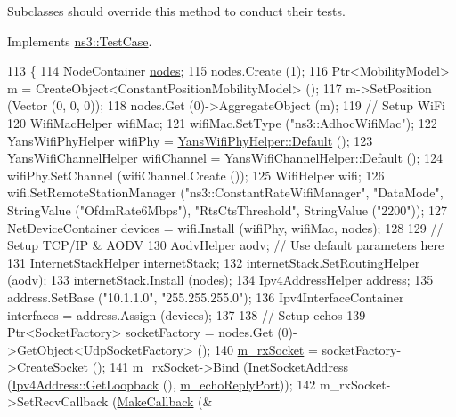 Subclasses should override this method to conduct their tests. 

Implements \hyperlink{classns3_1_1TestCase_a8ff74680cf017ed42011e4be51917a24}{ns3\+::\+Test\+Case}.


\begin{DoxyCode}
113 \{
114   NodeContainer \hyperlink{visualizer-ideas_8txt_a3e1b3808014a2c68ab0cd0182e041be2}{nodes};
115   nodes.Create (1);
116   Ptr<MobilityModel> m = CreateObject<ConstantPositionMobilityModel> ();
117   m->SetPosition (Vector (0, 0, 0));
118   nodes.Get (0)->AggregateObject (m);
119   \textcolor{comment}{// Setup WiFi}
120   WifiMacHelper wifiMac;
121   wifiMac.SetType (\textcolor{stringliteral}{"ns3::AdhocWifiMac"});
122   YansWifiPhyHelper wifiPhy = \hyperlink{classns3_1_1YansWifiPhyHelper_a75b0af43b173308e2f130605ddf34a7f}{YansWifiPhyHelper::Default} ();
123   YansWifiChannelHelper wifiChannel = \hyperlink{classns3_1_1YansWifiChannelHelper_a9a7fb65955fd9eb046600b89292e8062}{YansWifiChannelHelper::Default} ();
124   wifiPhy.SetChannel (wifiChannel.Create ());
125   WifiHelper wifi;
126   wifi.SetRemoteStationManager (\textcolor{stringliteral}{"ns3::ConstantRateWifiManager"}, \textcolor{stringliteral}{"DataMode"}, StringValue (\textcolor{stringliteral}{"OfdmRate6Mbps"}), \textcolor{stringliteral}{
      "RtsCtsThreshold"}, StringValue (\textcolor{stringliteral}{"2200"}));
127   NetDeviceContainer devices = wifi.Install (wifiPhy, wifiMac, nodes); 
128 
129   \textcolor{comment}{// Setup TCP/IP & AODV}
130   AodvHelper aodv; \textcolor{comment}{// Use default parameters here}
131   InternetStackHelper internetStack;
132   internetStack.SetRoutingHelper (aodv);
133   internetStack.Install (nodes);
134   Ipv4AddressHelper address;
135   address.SetBase (\textcolor{stringliteral}{"10.1.1.0"}, \textcolor{stringliteral}{"255.255.255.0"});
136   Ipv4InterfaceContainer interfaces = address.Assign (devices);
137 
138   \textcolor{comment}{// Setup echos}
139   Ptr<SocketFactory> socketFactory = nodes.Get (0)->GetObject<UdpSocketFactory> ();
140   \hyperlink{classns3_1_1aodv_1_1LoopbackTestCase_a18dd2548f7060a7d151df5cffb675288}{m\_rxSocket} = socketFactory->\hyperlink{classns3_1_1Socket_ad448a62bb50ad3dbac59c879a885a8d2}{CreateSocket} ();
141   m\_rxSocket->\hyperlink{classns3_1_1Socket_ada93439a43de2028b5a8fc6621dad482}{Bind} (InetSocketAddress (\hyperlink{classns3_1_1Ipv4Address_a583a93499e0d947439794d7bd0c6366d}{Ipv4Address::GetLoopback} (), 
      \hyperlink{classns3_1_1aodv_1_1LoopbackTestCase_ad168f9d1795693e634c9bed3f0a58f9e}{m\_echoReplyPort}));
142   m\_rxSocket->SetRecvCallback (\hyperlink{group__makecallbackmemptr_ga9376283685aa99d204048d6a4b7610a4}{MakeCallback} (&

\end{DoxyCode}
